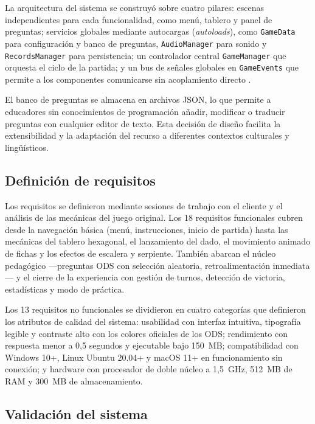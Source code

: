 \documentclass[12pt,a4paper]{article}
\begin{document}
La arquitectura del sistema se construyó sobre cuatro pilares: escenas independientes para cada funcionalidad, como menú, tablero y panel de preguntas; servicios globales mediante autocargas (\textit{autoloads}), como \texttt{GameData} para configuración y banco de preguntas, \texttt{AudioManager} para sonido y \texttt{RecordsManager} para persistencia; un controlador central \texttt{GameManager} que orquesta el ciclo de la partida; y un bus de señales globales en \texttt{GameEvents} que permite a los componentes comunicarse sin acoplamiento directo \citep{GodotDocs2026}.

El banco de preguntas se almacena en archivos JSON, lo que permite a educadores sin conocimientos de programación añadir, modificar o traducir preguntas con cualquier editor de texto. Esta decisión de diseño facilita la extensibilidad y la adaptación del recurso a diferentes contextos culturales y lingüísticos.

\subsection{Definición de requisitos}

Los requisitos se definieron mediante sesiones de trabajo con el cliente y el análisis de las mecánicas del juego original. Los 18 requisitos funcionales cubren desde la navegación básica (menú, instrucciones, inicio de partida) hasta las mecánicas del tablero hexagonal, el lanzamiento del dado, el movimiento animado de fichas y los efectos de escalera y serpiente. También abarcan el núcleo pedagógico —preguntas ODS con selección aleatoria, retroalimentación inmediata— y el cierre de la experiencia con gestión de turnos, detección de victoria, estadísticas y modo de práctica.

Los 13 requisitos no funcionales se dividieron en cuatro categorías que definieron los atributos de calidad del sistema: usabilidad con interfaz intuitiva, tipografía legible y contraste alto con los colores oficiales de los ODS; rendimiento con respuesta menor a 0,5 segundos y ejecutable bajo 150~MB; compatibilidad con Windows 10+, Linux Ubuntu 20.04+ y macOS 11+ en funcionamiento sin conexión; y hardware con procesador de doble núcleo a 1,5~GHz, 512~MB de RAM y 300~MB de almacenamiento.

\subsection{Validación del sistema}
\end{document}
